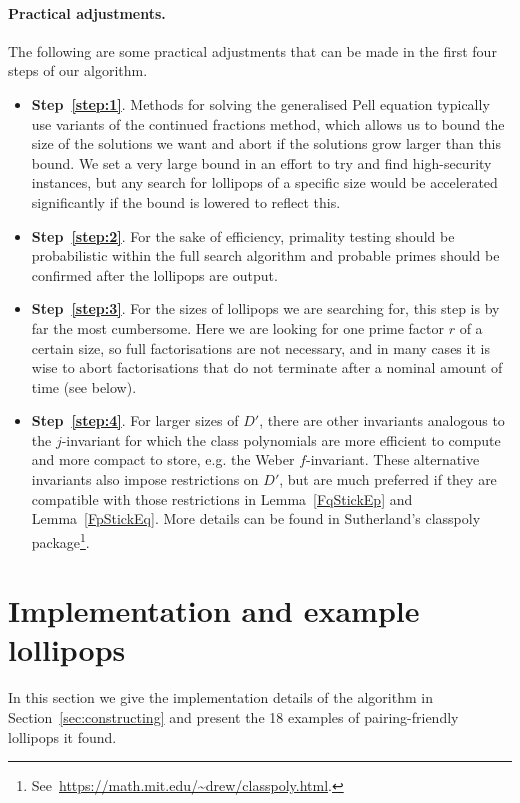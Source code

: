 \documentclass[version=preprint]{iacrcc}
\begin{document}
\paragraph{Practical adjustments.} The following are some practical adjustments that can be made in the first four steps of
our algorithm.
\begin{itemize}
	\item {\bf Step~\ref{step:1}}. Methods for solving the generalised Pell equation typically use variants of the continued fractions method, which allows us to bound the size of the solutions we want and abort if the solutions grow larger than this bound. We set a very large bound in an effort to try and find high-security instances, but any search for lollipops of a specific size would be accelerated significantly if the bound is lowered to reflect this. 
	\item {\bf Step~\ref{step:2}}. For the sake of efficiency, primality testing should be probabilistic within the full search algorithm and probable primes should be confirmed after the lollipops are output. 
	\item {\bf Step~\ref{step:3}}. For the sizes of lollipops we are searching for, this step is by far the most cumbersome. Here we are looking for one prime factor $r$ of a certain size, so full factorisations are not necessary, and in many cases it is wise to abort factorisations that do not terminate after a nominal amount of time (see below). 
	\item {\bf Step~\ref{step:4}}. For larger sizes of $D'$, there are other invariants analogous to the $j$-invariant for which the class polynomials are more efficient to compute and more compact to store, e.g. the Weber $f$-invariant. These alternative invariants also impose restrictions on $D'$, but are much preferred if they are compatible with those restrictions in Lemma~\ref{FqStickEp} and Lemma~\ref{FpStickEq}. More details can be found in Sutherland's {\sf classpoly} package\footnote{See~\url{https://math.mit.edu/~drew/classpoly.html}.}.
\end{itemize}

\section{Implementation and example lollipops}\label{sec:examples}


In this section we give the implementation details of the algorithm in Section~\ref{sec:constructing} and present the 18 examples of pairing-friendly lollipops it found. 
\end{document}
